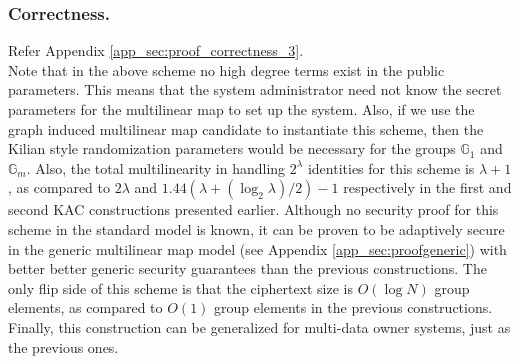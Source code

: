 \subsubsection{Correctness.} Refer Appendix \ref{app_sec:proof_correctness_3}.\\

\noindent Note that in the above scheme no high degree terms exist in the public parameters. This means that the system administrator need not know the secret parameters for the multilinear map to set up the system. Also, if we use the graph induced multilinear map candidate to instantiate this scheme, then the Kilian style randomization parameters would be necessary for the groups $\mathbb{G}_1$ and $\mathbb{G}_m$. Also, the total multilinearity in handling $2^{\lambda}$ identities for this scheme is $\lambda+1$, as compared to $2\lambda$ and $1.44(\lambda+(\log_2\lambda)/2)-1$ respectively in the first and second KAC constructions presented earlier. Although no security proof for this scheme in the standard model is known, it can be proven to be adaptively secure in the generic multilinear map model (see Appendix \ref{app_sec:proofgeneric}) with better better generic security guarantees than the previous constructions. The only flip side of this scheme is that the ciphertext size is $O(\log N)$ group elements, as compared to $O(1)$ group elements in the previous constructions. Finally, this construction can be generalized for multi-data owner systems, just as the previous ones. 

% 
% 
% 
% 
% 
% 
% 
% 

  